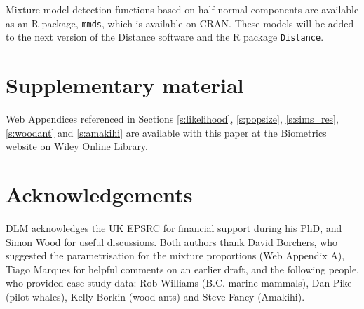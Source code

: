 \documentclass[authoryear,preprint,review,12pt]{elsarticle}
\begin{document}
Mixture model detection functions based on half-normal components are available as an \textsf{R} package, \texttt{mmds}, which is available on CRAN. These models will be added to the next version of the Distance software and the \textsf{R} package \texttt{Distance}.

\section*{Supplementary material}

Web Appendices referenced in Sections \ref{s:likelihood}, \ref{s:popsize}, \ref{s:sims_res}, \ref{s:woodant} and \ref{s:amakihi} are available with this paper at the Biometrics website on Wiley Online Library.

\section*{Acknowledgements}

DLM acknowledges the UK EPSRC for financial support during his PhD, and Simon Wood for useful discussions.  Both authors thank David Borchers, who suggested the parametrisation for the mixture proportions (Web Appendix A), Tiago Marques for helpful comments on an earlier draft, and the following people, who provided case study data: Rob Williams (B.C. marine mammals), Dan Pike (pilot whales), Kelly Borkin (wood ants) and Steve Fancy (Amakihi).




\label{lastpage}
\end{document}

